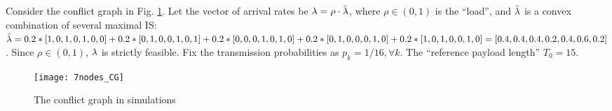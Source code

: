 \documentclass{IEEEtran}
\begin{document}
Consider the conflict graph in Fig. \ref{fig:7nodes_CG}. Let the
vector of arrival rates be ${\bf \lambda}=\rho\cdot\bar{{\bf \lambda}}$,
where $\rho\in(0,1)$ is the {}``load'', and $\bar{{\bf \lambda}}$
is a convex combination of several maximal IS: $\bar{{\bf \lambda}}=0.2*[1,0,1,0,1,0,0]+0.2*[0,1,0,0,1,0,1]+0.2*[0,0,0,1,0,1,0]+0.2*[0,1,0,0,0,1,0]+0.2*[1,0,1,0,0,1,0]=[0.4,0.4,0.4,0.2,0.4,0.6,0.2]$.
Since $\rho\in(0,1)$, ${\bf \lambda}$ is strictly feasible. Fix
the transmission probabilities as $p_{k}=1/16,\forall k$. The {}``reference
payload length'' $T_{0}=15$. \begin{figure}
\begin{centering}
\texttt{[image: 7nodes\_CG]}
\par\end{centering}

\caption{\label{fig:7nodes_CG}The conflict graph in simulations}

\end{figure}
\begin{comment}
Now we vary $\rho$ and $\eta$. And in each case we solve problem
(\ref{eq:loglikelihood-primal_c}) to obtain the required mean payload
length $T_{k}^{p}:=T_{0}\cdot\exp(r_{k}^{*}),k=1,2,\dots,7$. Fig.
\ref{fig:mean-payload} (a) shows how $T_{k}^{p}$'s change as the
load $\rho$ changes, with $\eta=1$. Clearly, as $\rho$ increases,
the $T_{k}^{p}$'s tend to increase. Also, the rate of increase becomes
faster as $\rho$ approaches 1. Therefore, as mentioned before, there
is a tradeoff between the throughput and transmission lengths (larger
transmission lengths introduce larger delays for conflicting links).
Fig. \ref{fig:mean-payload} (b) shows how the $T_{k}^{p}$'s depend
on the relative size $\eta$ of the overhead (with fixed $\rho=0.8$
and $\eta\in\{1,0.5,0.2\}$). As expected, the smaller the overhead,
the smaller $T_{k}^{p}$'s are required. 

\noindent \begin{figure}
\begin{centering}
\subfloat[Relation with the load (given $\eta=1$)]{\begin{centering}
\texttt{[image: length\_vs\_load2.eps]}
\par\end{centering}

}
\par\end{centering}

\begin{centering}
\subfloat[Relation with the overhead (given $\rho=0.8$)]{\begin{centering}
\texttt{[image: length\_vs\_overhead2.eps]}
\par\end{centering}

}
\par\end{centering}

\caption{\label{fig:mean-payload}Required mean payload lengths}

\end{figure}

\end{comment}
{}
\end{document}
